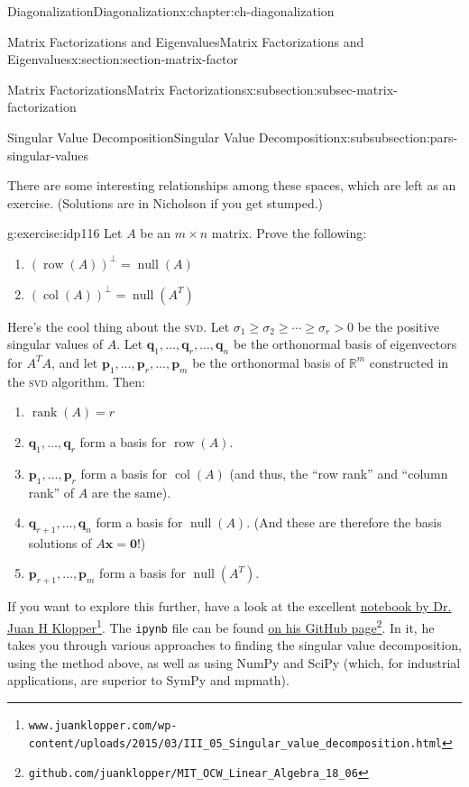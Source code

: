 \documentclass[oneside,10pt,]{book}
\newcommand{\mono}[1]{\texttt{#1}}
\newcommand{\initialism}[1]{\textsc{\MakeLowercase{#1}}}
\numberwithin{equation}{section}
\newcommand{\R}{\mathbb{R}}
\newcommand{\nll}{\operatorname{null}}
\newcommand{\csp}{\operatorname{col}}
\newcommand{\rank}{\operatorname{rank}}
\newcommand{\xx}{\mathbf{x}}
\newcommand{\zer}{\mathbf{0}}
\newcommand{\vecq}{\mathbf{q}}
\newcommand{\vecp}{\mathbf{p}}
\newcommand{\gt}{>}
\begin{document}
\begin{chapterptx}{Diagonalization}{}{Diagonalization}{}{}{x:chapter:ch-diagonalization}
\begin{sectionptx}{Matrix Factorizations and Eigenvalues}{}{Matrix Factorizations and Eigenvalues}{}{}{x:section:section-matrix-factor}
\begin{subsectionptx}{Matrix Factorizations}{}{Matrix Factorizations}{}{}{x:subsection:subsec-matrix-factorization}
\begin{subsubsectionptx}{Singular Value Decomposition}{}{Singular Value Decomposition}{}{}{x:subsubsection:pars-singular-values}
%
\par
There are some interesting relationships among these spaces, which are left as an exercise. (Solutions are in Nicholson if you get stumped.)%
\begin{inlineexercise}{}{g:exercise:idp116}%
Let \(A\) be an \(m\times n\) matrix. Prove the following:%
\begin{enumerate}
\item{}\(\displaystyle (\operatorname{row}(A))^\bot = \nll(A)\)%
\item{}\(\displaystyle (\csp(A))^\bot = \nll(A^T)\)%
\end{enumerate}
%
\end{inlineexercise}%
Here's the cool thing about the \initialism{SVD}. Let \(\sigma_1\geq \sigma_2\geq \cdots \geq \sigma_r\gt 0\) be the positive singular values of \(A\). Let \(\vecq_1,\ldots, \vecq_r,\ldots, \vecq_n\) be the orthonormal basis of eigenvectors for \(A^TA\), and let \(\vecp_1,\ldots, \vecp_r,\ldots, \vecp_m\) be the orthonormal basis of \(\R^m\) constructed in the \initialism{SVD} algorithm. Then:%
\par
%
\begin{enumerate}
\item{}\(\displaystyle \rank(A)=r\)%
\item{}\(\vecq_1,\ldots, \vecq_r\) form a basis for \(\operatorname{row}(A)\).%
\item{}\(\vecp_1,\ldots, \vecp_r\) form a basis for \(\csp(A)\) (and thus, the ``row rank'' and ``column rank'' of \(A\) are the same).%
\item{}\(\vecq_{r+1},\ldots, \vecq_n\) form a basis for \(\nll(A)\). (And these are therefore the basis solutions of \(A\xx=\zer\)!)%
\item{}\(\vecp_{r+1},\ldots, \vecp_m\) form a basis for \(\nll(A^T)\).%
\end{enumerate}
%
\par
If you want to explore this further, have a look at the excellent \href{https://www.juanklopper.com/wp-content/uploads/2015/03/III_05_Singular_value_decomposition.html}{notebook by Dr. Juan H Klopper}\footnote{\nolinkurl{www.juanklopper.com/wp-content/uploads/2015/03/III_05_Singular_value_decomposition.html}\label{g:fn:idp117}}. The \mono{ipynb} file can be found \href{https://github.com/juanklopper/MIT_OCW_Linear_Algebra_18_06}{on his GitHub page}\footnote{\nolinkurl{github.com/juanklopper/MIT_OCW_Linear_Algebra_18_06}\label{g:fn:idp118}}. In it, he takes you through various approaches to finding the singular value decomposition, using the method above, as well as using NumPy and SciPy (which, for industrial applications, are superior to SymPy and mpmath).%

\end{subsubsectionptx}
\end{subsectionptx}
\end{sectionptx}
\end{chapterptx}
\end{document}
